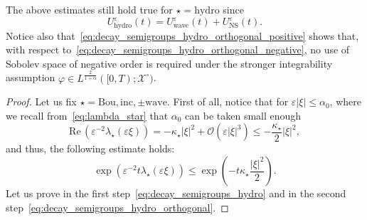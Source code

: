 \documentclass[AHL,Unicode,longabstracts,published]{cedram}
\newcommand{\ns}{\mathrm{NS}}
\newcommand{\hyd}{\mathrm{hydro}}
\newcommand{\Wave}{\mathrm{wave}}
\newcommand{\Inc}{\mathrm{inc}}
\newcommand{\Bou}{\mathrm{Bou}}
\newcommand{\re}{\mathrm{Re}\,}
\newcommand{\OO}{\mathcal{O}}
\newcommand{\XX}{\mathcal{X}}
\newcommand{\SSlm}{\XX^{\circ}}
\renewcommand*\le{\leqslant}
\newcommand*\eps{{\varepsilon}}
\begin{document}
\begin{rema}
The above estimates still hold true for $\star=\hyd$ since
\[
U^\eps_\hyd(t)=U^\eps_\Wave(t)+U^\eps_\ns(t).
\]
Notice also that~\eqref{eq:decay_semigroups_hydro_orthogonal_positive} shows that, with respect to~\eqref{eq:decay_semigroups_hydro_orthogonal_negative}, no use of Sobolev space of negative order is required under the stronger integrability assumption $\varphi \in L^{\frac{2}{1+\alpha}}([0, T) ; \SSlm)$.
\end{rema}

\begin{proof}
Let us fix $\star=\Bou,\Inc,\pm\Wave$. First of all, notice that for $\eps | \xi | \le \alpha_{0}$, where we recall from~\eqref{eq:lambda_star} that $\alpha_{0}$ can be taken small enough
\[
\re \left(\eps^{-2} \lambda_\star(\eps \xi) \right) = - \kappa_\star | \xi |^2 + \OO\left(\eps | \xi |^3 \right) \le - \frac{\kappa_\star}{2} | \xi |^2,
\]
and thus, the following estimate holds:
\[
\exp\left(\eps^{-2} t \lambda_\star(\eps \xi) \right) \le \exp\left(- t \kappa_\star \frac{|\xi|^2}{2}\right).
\]
Let us prove in the first step~\eqref{eq:decay_semigroups_hydro} and in the second step~\eqref{eq:decay_semigroups_hydro_orthogonal}.


\end{proof}
\end{document}
